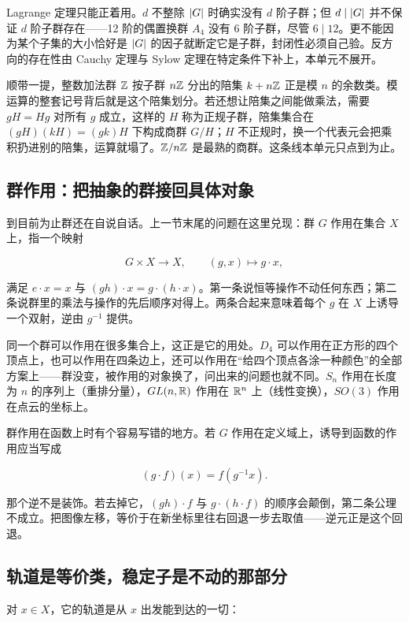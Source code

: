 Lagrange 定理只能正着用。\(d\) 不整除 \(\left|G\right|\) 时确实没有 \(d\) 阶子群；但 \(d\mid\left|G\right|\) 并不保证 \(d\) 阶子群存在——12 阶的偶置换群 \(A_4\) 没有 6 阶子群，尽管 \(6\mid12\)。更不能因为某个子集的大小恰好是 \(\left|G\right|\) 的因子就断定它是子群，封闭性必须自己验。反方向的存在性由 Cauchy 定理与 Sylow 定理在特定条件下补上，本单元不展开。

顺带一提，整数加法群 \(\mathbb{Z}\) 按子群 \(n\mathbb{Z}\) 分出的陪集 \(k+n\mathbb{Z}\) 正是模 \(n\) 的余数类。模运算的整套记号背后就是这个陪集划分。若还想让陪集之间能做乘法，需要 \(gH=Hg\) 对所有 \(g\) 成立，这样的 \(H\) 称为正规子群，陪集集合在 \((gH)(kH)=(gk)H\) 下构成商群 \(G/H\)；\(H\) 不正规时，换一个代表元会把乘积扔进别的陪集，运算就塌了。\(\mathbb{Z}/n\mathbb{Z}\) 是最熟的商群。这条线本单元只点到为止。

\subsection{群作用：把抽象的群接回具体对象}

到目前为止群还在自说自话。上一节末尾的问题在这里兑现：群 \(G\) 作用在集合 \(X\) 上，指一个映射

\[
G\times X\longrightarrow X,\qquad (g,x)\longmapsto g\cdot x,
\]

满足 \(e\cdot x=x\) 与 \((gh)\cdot x=g\cdot(h\cdot x)\)。第一条说恒等操作不动任何东西；第二条说群里的乘法与操作的先后顺序对得上。两条合起来意味着每个 \(g\) 在 \(X\) 上诱导一个双射，逆由 \(g^{-1}\) 提供。

同一个群可以作用在很多集合上，这正是它的用处。\(D_4\) 可以作用在正方形的四个顶点上，也可以作用在四条边上，还可以作用在``给四个顶点各涂一种颜色''的全部方案上——群没变，被作用的对象换了，问出来的问题也就不同。\(S_n\) 作用在长度为 \(n\) 的序列上（重排分量），\(GL(n,\mathbb{R})\) 作用在 \(\mathbb{R}^n\) 上（线性变换），\(SO(3)\) 作用在点云的坐标上。

群作用在函数上时有个容易写错的地方。若 \(G\) 作用在定义域上，诱导到函数的作用应当写成

\[
(g\cdot f)(x)=f(g^{-1}x).
\]

那个逆不是装饰。若去掉它，\((gh)\cdot f\) 与 \(g\cdot(h\cdot f)\) 的顺序会颠倒，第二条公理不成立。把图像左移，等价于在新坐标里往右回退一步去取值——逆元正是这个回退。

\subsection{轨道是等价类，稳定子是不动的那部分}

对 \(x\in X\)，它的轨道是从 \(x\) 出发能到达的一切：

